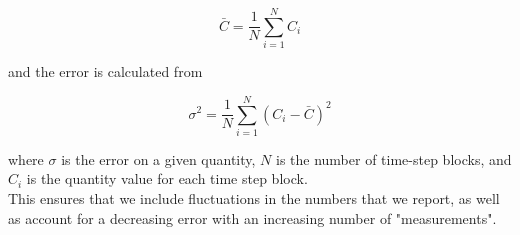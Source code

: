 \documentclass{article}
\begin{document}
\begin{multicols}{2}
\begin{equation}
\bar{C} = \frac{1}{N}\sum \limits _{i=1}^N C_i 
\end{equation}

\noindent and the error is calculated from 

\begin{equation}
\sigma ^2 = \frac{1}{N}\sum \limits _{i=1}^N (C_i - \bar{C})^2
\end{equation}

\noindent where $\sigma$ is the error on a given quantity, $N$ is the number of time-step blocks, and $C_i$ is the quantity value for each time step block.\\

This ensures that we include fluctuations in the numbers that we report, as well as account for a decreasing error with an increasing number of "measurements".  

\end{multicols}




  
\end{document}

